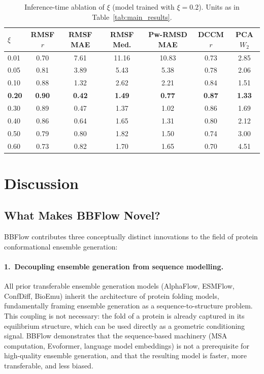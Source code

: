 \documentclass[12pt,a4paper]{article}
\begin{document}
\begin{table}[h]
  \centering
  \caption{Inference-time ablation of $\xi$ (model trained with $\xi = 0.2$).
    Units as in Table~\ref{tab:main_results}.}
  \label{tab:xi_ablation}
  \begin{tabular}{lcccccc}
    \toprule
    $\xi$ & RMSF $r$ & RMSF MAE & RMSF Med. & Pw-RMSD MAE & DCCM $r$ & PCA $W_2$ \\
    \midrule
    0.01 & 0.70 & 7.61 & 11.16 & 10.83 & 0.73 & 2.85 \\
    0.05 & 0.81 & 3.89 &  5.43 &  5.38 & 0.78 & 2.06 \\
    0.10 & 0.88 & 1.32 &  2.62 &  2.21 & 0.84 & 1.51 \\
    \textbf{0.20} & \textbf{0.90} & \textbf{0.42} & \textbf{1.49} & \textbf{0.77}
      & \textbf{0.87} & \textbf{1.33} \\
    0.30 & 0.89 & 0.47 &  1.37 &  1.02 & 0.86 & 1.69 \\
    0.40 & 0.86 & 0.64 &  1.65 &  1.31 & 0.80 & 2.12 \\
    0.50 & 0.79 & 0.80 &  1.82 &  1.50 & 0.74 & 3.00 \\
    0.60 & 0.73 & 0.82 &  1.70 &  1.65 & 0.70 & 4.51 \\
    \bottomrule
  \end{tabular}
\end{table}

\section{Discussion}
\label{sec:discussion}

\subsection{What Makes BBFlow Novel?}
\label{sec:novelty}

BBFlow contributes three conceptually distinct innovations to the field of protein conformational
ensemble generation:

\paragraph{1.\ Decoupling ensemble generation from sequence modelling.}
All prior transferable ensemble generation models (AlphaFlow, ESMFlow, ConfDiff, BioEmu)
inherit the architecture of protein folding models, fundamentally framing ensemble generation
as a sequence-to-structure problem.  This coupling is not necessary: the fold of a protein
is already captured in its equilibrium structure, which can be used directly as a geometric
conditioning signal.  BBFlow demonstrates that the sequence-based machinery (MSA computation,
Evoformer, language model embeddings) is not a prerequisite for high-quality ensemble generation,
and that the resulting model is faster, more transferable, and less biased.
\end{document}

